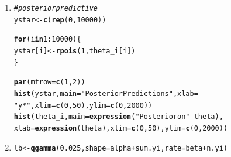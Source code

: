 \documentclass{article}\usepackage[]{graphicx}\usepackage[]{color}
\makeatletter
\newcommand{\hlnum}[1]{\textcolor[rgb]{0.686,0.059,0.569}{#1}}%
\newcommand{\hlstr}[1]{\textcolor[rgb]{0.192,0.494,0.8}{#1}}%
\newcommand{\hlcom}[1]{\textcolor[rgb]{0.678,0.584,0.686}{\textit{#1}}}%
\newcommand{\hlopt}[1]{\textcolor[rgb]{0,0,0}{#1}}%
\newcommand{\hlstd}[1]{\textcolor[rgb]{0.345,0.345,0.345}{#1}}%
\newcommand{\hlkwa}[1]{\textcolor[rgb]{0.161,0.373,0.58}{\textbf{#1}}}%
\newcommand{\hlkwb}[1]{\textcolor[rgb]{0.69,0.353,0.396}{#1}}%
\newcommand{\hlkwc}[1]{\textcolor[rgb]{0.333,0.667,0.333}{#1}}%
\newcommand{\hlkwd}[1]{\textcolor[rgb]{0.737,0.353,0.396}{\textbf{#1}}}%
\newenvironment{kframe}{%
 \def\at@end@of@kframe{}%
 \ifinner\ifhmode%
  \def\at@end@of@kframe{\end{minipage}}%
  \begin{minipage}{\columnwidth}%
 \fi\fi%
 \def\FrameCommand##1{\hskip\@totalleftmargin \hskip-\fboxsep
 \colorbox{shadecolor}{##1}\hskip-\fboxsep
     \hskip-\linewidth \hskip-\@totalleftmargin \hskip\columnwidth}%
 \MakeFramed {\advance\hsize-\width
   \@totalleftmargin\z@ \linewidth\hsize
   \@setminipage}}%
 {\par\unskip\endMakeFramed%
 \at@end@of@kframe}
\newenvironment{knitrout}{}{} %
\makeatother
\begin{document}
{\begin{enumerate}
\begin{enumerate}
\begin{knitrout}
\begin{kframe}
\begin{alltt}
\hlstd{alpha} \hlkwb{=} \hlnum{0}
\hlstd{beta} \hlkwb{=} \hlnum{1}
\end{alltt}
\end{kframe}
\end{knitrout}
\begin{knitrout}
\color{fgcolor}\begin{kframe}
\begin{alltt}
\hlcom{#posterior on theta}
\hlkwd{set.seed}\hlstd{(}\hlnum{532}\hlstd{)}
\hlstd{theta_i} \hlkwb{<-} \hlkwd{rgamma}\hlstd{(}\hlnum{10000}\hlstd{, alpha} \hlopt{+} \hlstd{sum.yi, beta} \hlopt{+} \hlstd{n.yi)}
\end{alltt}
\end{kframe}
\end{knitrout}
\item%
\begin{knitrout}
\color{fgcolor}\begin{kframe}
\begin{alltt}
\hlcom{#posterior predictive}
\hlstd{ystar} \hlkwb{<-} \hlkwd{c}\hlstd{(}\hlkwd{rep}\hlstd{(}\hlnum{0}\hlstd{,}\hlnum{10000}\hlstd{))}

\hlkwa{for}\hlstd{(i} \hlkwa{in} \hlnum{1}\hlopt{:}\hlnum{10000}\hlstd{)\{}
\hlstd{ystar[i]} \hlkwb{<-} \hlkwd{rpois}\hlstd{(}\hlnum{1}\hlstd{, theta_i[i])}
\hlstd{\}}

\hlkwd{par}\hlstd{(}\hlkwc{mfrow}\hlstd{=}\hlkwd{c}\hlstd{(}\hlnum{1}\hlstd{,}\hlnum{2}\hlstd{))}
\hlkwd{hist}\hlstd{(ystar,} \hlkwc{main} \hlstd{=} \hlstr{"Posterior Predictions"}\hlstd{,} \hlkwc{xlab} \hlstd{=}
       \hlstr{"y*"}\hlstd{,} \hlkwc{xlim}\hlstd{=}\hlkwd{c}\hlstd{(}\hlnum{0}\hlstd{,}\hlnum{50}\hlstd{),} \hlkwc{ylim} \hlstd{=} \hlkwd{c}\hlstd{(}\hlnum{0}\hlstd{,}\hlnum{2000}\hlstd{))}
\hlkwd{hist}\hlstd{(theta_i,} \hlkwc{main} \hlstd{=} \hlkwd{expression}\hlstd{(}\hlstr{"Posterior on"} \hlopt{~} \hlstd{theta),}
     \hlkwc{xlab} \hlstd{=} \hlkwd{expression}\hlstd{(theta),} \hlkwc{xlim}\hlstd{=}\hlkwd{c}\hlstd{(}\hlnum{0}\hlstd{,}\hlnum{50}\hlstd{),} \hlkwc{ylim} \hlstd{=} \hlkwd{c}\hlstd{(}\hlnum{0}\hlstd{,}\hlnum{2000}\hlstd{))}
\end{alltt}
\end{kframe}
\end{knitrout}
\item%
\begin{knitrout}
\color{fgcolor}\begin{kframe}
\begin{alltt}
\hlstd{lb} \hlkwb{<-} \hlkwd{qgamma}\hlstd{(}\hlnum{0.025}\hlstd{,} \hlkwc{shape} \hlstd{= alpha} \hlopt{+} \hlstd{sum.yi,} \hlkwc{rate} \hlstd{= beta} \hlopt{+} \hlstd{n.yi)}


\end{alltt}
\end{kframe}
\end{knitrout}
\end{enumerate}
\end{enumerate}}
\end{document}

